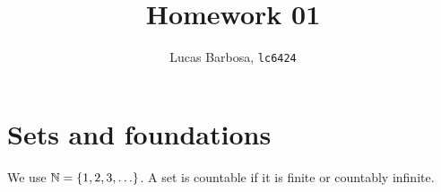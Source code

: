 \documentclass[nohyper,nobib,nofonts]{tufte-handout}
\title{Homework 01}
\author[Lucas Barbosa, lc6424]{Lucas Barbosa, \texttt{lc6424}}
\date{}
\begin{document}
\maketitle

\section{Sets and foundations}
\label{sec:hw01:sets-and-foundations}

We use $\mathbb{N}=\{1,2,3,\ldots\}$. A set is countable if it is finite
or countably infinite.




























\end{document}
